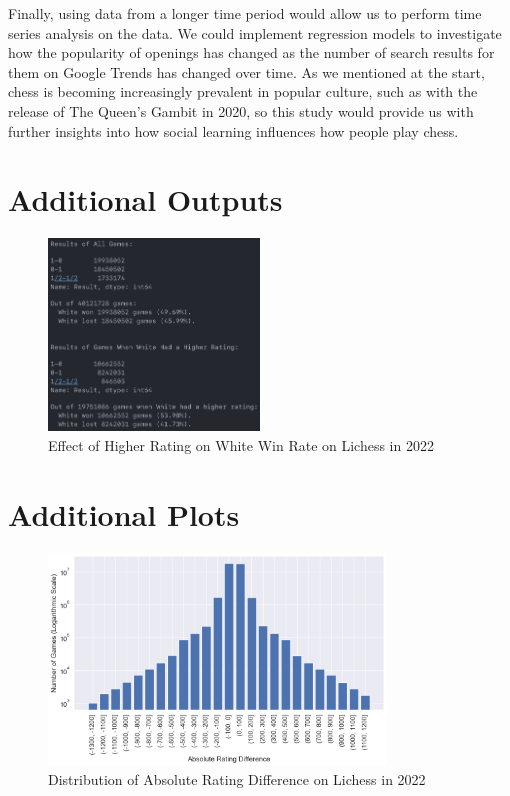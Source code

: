 \documentclass[a4paper, 11pt]{article}
\begin{document}
Finally, using data from a longer time period would allow us to perform time series analysis on the data. We could implement regression models to investigate how the popularity of openings has changed as the number of search results for them on Google Trends has changed over time. As we mentioned at the start, chess is becoming increasingly prevalent in popular culture, such as with the release of The Queen's Gambit in 2020, so this study would provide us with further insights into how social learning influences how people play chess.




\newpage
\begin{appendices}

\section{Additional Outputs}
\begin{figure}[H]
    \centering
    \caption{Effect of Higher Rating on White Win Rate on Lichess in 2022}
    \label{fig:effectOfHigherRatingOnWhiteWinRate}
    \includegraphics[width=0.5\textwidth]{Effect of Higher Rating on White Win Rate.png}
\end{figure}

\section{Additional Plots}
\begin{figure}[H]
    \centering
    \caption{Distribution of Absolute Rating Difference on Lichess in 2022}
    \label{fig:distributionOfAbsoluteRatingDifference}
    \includegraphics[width=0.8\textwidth]{Distribution of Absolute Rating Difference.png}
\end{figure}


\end{appendices}
\end{document}
